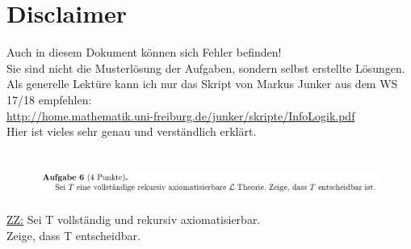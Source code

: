 \documentclass[a4paper]{scrartcl}%
\begin{document}
\section*{Disclaimer}
\label{sec:disclaimer}
Auch in diesem Dokument können sich Fehler befinden!\\
Sie sind nicht die Musterlösung der Aufgaben, sondern selbst erstellte Lösungen.\\

Als generelle Lektüre kann ich nur das Skript von Markus Junker aus dem WS 17/18 empfehlen:\\
\url{http://home.mathematik.uni-freiburg.de/junker/skripte/InfoLogik.pdf}\\
Hier ist vieles sehr genau und verständlich erklärt.

\section*{}%
\label{sec:aufgabe_6}

    \begin{figure}[H]
        \centering
        \includegraphics[scale=0.3]{./A-6.png}
        \label{fig:./A-6}
    \end{figure}

    \underline{ZZ:} Sei T vollständig und rekursiv axiomatisierbar.\\
    Zeige, dass T entscheidbar.\\
\end{document}
